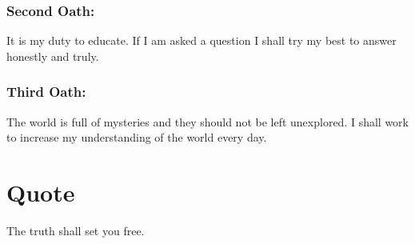 \subsubsection*{Second Oath:} It is my duty to educate. If I am asked a question I shall try my best to answer honestly and truly. 
\subsubsection*{Third Oath:} The world is full of mysteries and they should not be left unexplored. I shall work to increase my understanding of the world every day.
\section*{Quote}
The truth shall set you free. 

